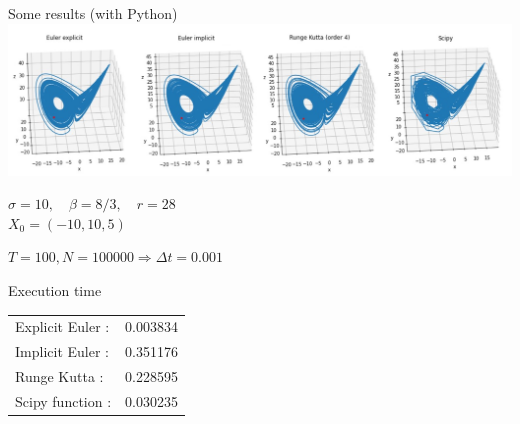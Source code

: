 \documentclass[10pt,xcolor={table,dvipsnames},t]{beamer}
\begin{document}
\begin{frame}[allowframebreaks]{Some results (with Python)}
		\includegraphics[width=\textwidth]{images/N100000.png} \\ 
		\begin{center}
			\begin{minipage}[c]{0.5\linewidth}
				$\sigma=10,\quad \beta=8/3, \quad r=28$ \\
				$X_0=(-10,10,5)$ 
			\end{minipage}
			$T=100, N = 100000 \Rightarrow \Delta t=0.001$
		\end{center}
		
		\newpage
		
		\begin{block}{Execution time}
			\; \\
			\begin{center}
				\begin{tabular}{ll}
					Explicit Euler :&  0.003834 \\
					Implicit Euler :&  0.351176 \\
					Runge Kutta :& 0.228595 \\
					Scipy function :&  0.030235
				\end{tabular}
			\end{center}
		\end{block}
		
	\end{frame}
	
\end{document}
